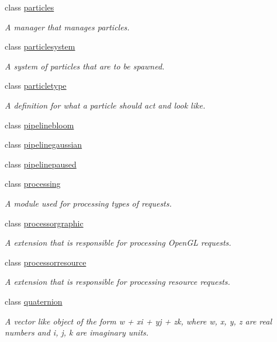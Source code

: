 \begin{DoxyCompactItemize}
class \hyperlink{classflounder_1_1particles}{particles}
\begin{DoxyCompactList}\small\item\em A manager that manages particles. \end{DoxyCompactList}\item 
class \hyperlink{classflounder_1_1particlesystem}{particlesystem}
\begin{DoxyCompactList}\small\item\em A system of particles that are to be spawned. \end{DoxyCompactList}\item 
class \hyperlink{classflounder_1_1particletype}{particletype}
\begin{DoxyCompactList}\small\item\em A definition for what a particle should act and look like. \end{DoxyCompactList}\item 
class \hyperlink{classflounder_1_1pipelinebloom}{pipelinebloom}
\item 
class \hyperlink{classflounder_1_1pipelinegaussian}{pipelinegaussian}
\item 
class \hyperlink{classflounder_1_1pipelinepaused}{pipelinepaused}
\item 
class \hyperlink{classflounder_1_1processing}{processing}
\begin{DoxyCompactList}\small\item\em A module used for processing types of requests. \end{DoxyCompactList}\item 
class \hyperlink{classflounder_1_1processorgraphic}{processorgraphic}
\begin{DoxyCompactList}\small\item\em A extension that is responsible for processing Open\+GL requests. \end{DoxyCompactList}\item 
class \hyperlink{classflounder_1_1processorresource}{processorresource}
\begin{DoxyCompactList}\small\item\em A extension that is responsible for processing resource requests. \end{DoxyCompactList}\item 
class \hyperlink{classflounder_1_1quaternion}{quaternion}
\begin{DoxyCompactList}\small\item\em A vector like object of the form w + xi + yj + zk, where w, x, y, z are real numbers and i, j, k are imaginary units. \end{DoxyCompactList}\item 

\end{DoxyCompactItemize}
